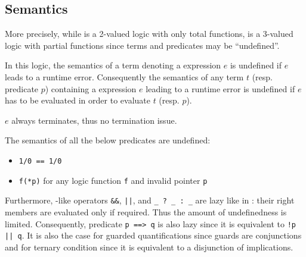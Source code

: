 
\subsection{Semantics}
\label{sec:semantics}


More precisely, while \acsl is a 2-valued logic with only total
functions, \eacsl is a 3-valued logic with partial functions since
terms and predicates may be ``undefined''.

In this logic, the semantics of a term denoting a \C expression $e$ is undefined
if $e$ leads to a runtime error. Consequently the semantics of any term $t$
(resp. predicate $p$) containing a \C expression $e$ leading to a runtime error
is undefined if $e$ has to be evaluated in order to evaluate $t$ (resp. $p$).
\begin{remark}[Julien]
$e$ always terminates, thus no termination issue.
\end{remark}
\begin{example}
The semantics of all the below predicates are undefined:
\begin{itemize}
\item \lstinline|1/0 == 1/0|
\item \lstinline|f(*p)| for any logic function \lstinline|f| and invalid pointer
  \lstinline|p|
\end{itemize}
\end{example}

Furthermore, \C-like operators \lstinline|&&|, \lstinline+||+, and
\lstinline|_ ? _ : _| are lazy like in \C: their right members are evaluated 
only if required. Thus the amount of undefinedness is limited. Consequently,
predicate \lstinline|p ==> q| is also lazy since it is equivalent
to \lstinline+!p || q+. It is also the case for guarded quantifications since
guards are conjunctions and for ternary condition since it is equivalent to a
disjunction of implications.


